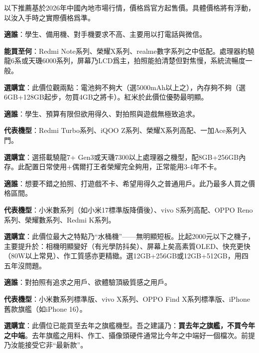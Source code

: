 
以下推薦基於2026年中國內地市場行情，價格爲官方起售價。具體價格將有浮動，以汝入手時之實際價格爲準。


\textbf{適誰}：學生、備用機、對手機要求不高、主要用以打電話與微信。

\textbf{能買至何}：Redmi Note系列、榮耀X系列、realme數字系列之中低配。處理器約驍龍6系或天璣6000系列，屏幕乃LCD爲主，拍照能拍清楚但對焦慢，系統流暢度一般。

\textbf{選購宜}：此價位觀兩點：電池夠不夠大（選5000mAh以上之），內存夠不夠（選6GB+128GB起步，勿買4GB之將卡）。紅米於此價位優勢最明顯。


\textbf{適誰}：學生、預算有限但欲用得久、對拍照與遊戲無極致追求。

\textbf{代表機型}：Redmi Turbo系列、iQOO Z系列、榮耀X系列高配、一加Ace系列入門。

\textbf{選購宜}：選搭載驍龍7+ Gen3或天璣7300以上處理器之機型，配8GB+256GB內存。此配置日常使用+偶爾打王者榮耀完全夠用，正常能用3-4年不卡。


\textbf{適誰}：想要不錯之拍照、打遊戲不卡、希望用得久之普通用戶。此乃最多人買之價格區間。

\textbf{代表機型}：小米數系列（如小米17標準版降價後）、vivo S系列高配、OPPO Reno系列、榮耀數系列、Redmi K系列。

\textbf{選購宜}：此價位最大之特點乃“水桶機”——無明顯短板。比起2000元以下之機子，主要提升於：相機明顯變好（有光學防抖矣）、屏幕上矣高素質OLED、快充更快（80W以上常見）、作工質感亦更精緻。選12GB+256GB或12GB+512GB，用四五年沒問題。


\textbf{適誰}：對拍照有追求之用戶、欲體驗頂級質感之用戶。

\textbf{代表機型}：小米數系列標準版、vivo X系列、OPPO Find X系列標準版、iPhone舊款旗艦（如iPhone 16）。

\textbf{選購宜}：此價位已能買至去年之旗艦機型。吾之建議乃：\textbf{買去年之旗艦，不買今年之中端}。去年旗艦之用料、作工、攝像頭硬件通常比今年之中端好一個檔次。前提乃汝能接受它非“最新款”。


